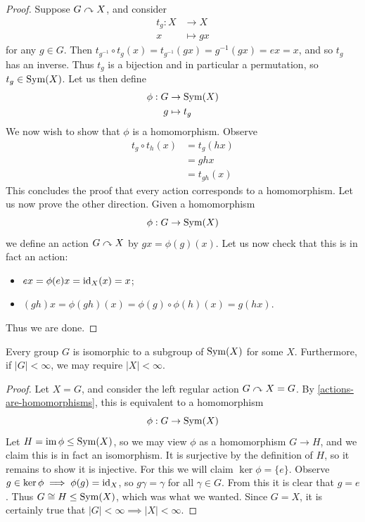 \documentclass{../../template/note}
\begin{document}
    \begin{proof}
        Suppose \(G \curvearrowright X\), and consider
        \begin{align*}
            t_g: X &\to X \\
            x &\mapsto gx
        \end{align*}
        for any \(g \in G\). Then \(t_{g^{-1}} \circ t_g(x) = t_{g^{-1}}(gx) = g^{-1}(gx) = ex = x\), and so \(t_g\) has an inverse. Thus \(t_g\) is a bijection and in particular a permutation, so \(t_g \in \operatorname{Sym}(X)\). Let us then define
        \begin{align*}
            \phi: G &\to \operatorname{Sym}(X) \\
            g &\mapsto t_g
        \end{align*}
        We now wish to show that \(\phi\) is a homomorphism. Observe
        \begin{align*}
            t_g \circ t_h (x) &= t_g(hx) \\
            &= ghx \\
            &= t_{gh}(x)
        \end{align*}
        This concludes the proof that every action corresponds to a homomorphism. Let us now prove the other direction. Given a homomorphism
        \[
            \phi: G \to \operatorname{Sym}(X)
        \]   
        we define an action \(G \curvearrowright X\) by \(gx = \phi(g)(x)\). Let us now check that this is in fact an action:
        \begin{itemize}
            \item \(ex = \phi(e)x = \operatorname{id}_X(x) = x\);
            \item \((gh)x = \phi(gh)(x) = \phi(g) \circ \phi(h)(x) = g(hx)\).
        \end{itemize}
        Thus we are done.           
    \end{proof}
    
    \begin{theorem}[Cayley]
        Every group \(G\) is isomorphic to a subgroup of \(\operatorname{Sym}(X)\) for some \(X\). Furthermore, if \(|G| < \infty\), we may require \(|X| < \infty\).
    \end{theorem}
    
    \begin{proof}
        Let \(X = G\), and consider the left regular action \(G \curvearrowright X=G\). By \cref{actions-are-homomorphisms}, this is equivalent to a homomorphism
        \[
            \phi: G \to \operatorname{Sym}(X)
        \]
        Let \(H = \operatorname{im} \phi \leq \operatorname{Sym}(X)\), so we may view \(\phi\) as a homomorphism \(G \to H\), and we claim this is in fact an isomorphism. It is surjective by the definition of \(H\), so it remains to show it is injective. For this we will claim \(\ker \phi = \{e\}\). Observe \(g \in \ker \phi \implies \phi(g) = \operatorname{id}_X\), so \(g\gamma = \gamma\) for all \(\gamma \in G\). From this it is clear that \(g = e\). Thus \(G \cong H \leq \operatorname{Sym}(X)\), which was what we wanted. Since \(G = X\), it is certainly true that \(|G| < \infty \implies |X| < \infty\).
    \end{proof}
    
\end{document}

